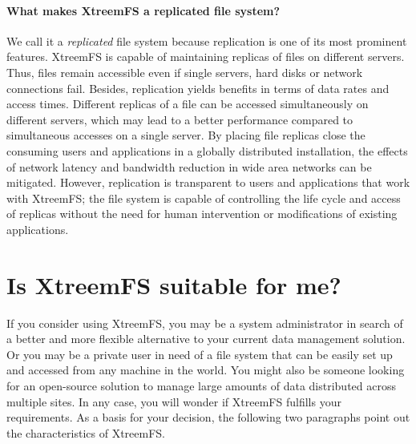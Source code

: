 \documentclass[a4paper,10pt]{book}
\begin{document}
\paragraph{What makes XtreemFS a replicated file system?} We call it a \emph{replicated} file system because replication is one of its most prominent features. XtreemFS is capable of maintaining replicas of files on different servers. Thus, files remain accessible even if single servers, hard disks or network connections fail. Besides, replication yields benefits in terms of data rates and access times. Different replicas of a file can be accessed simultaneously on different servers, which may lead to a better performance compared to simultaneous accesses on a single server. By placing file replicas close the consuming users and applications in a globally distributed installation, the effects of network latency and bandwidth reduction in wide area networks can be mitigated. However, replication is transparent to users and applications that work with XtreemFS; the file system is capable of controlling the life cycle and access of replicas without the need for human intervention or modifications of existing applications.

\section{Is XtreemFS suitable for me?}
If you consider using XtreemFS, you may be a system administrator in search of a better and more flexible alternative to your current data management solution. Or you may be a private user in need of a file system that can be easily set up and accessed from any machine in the world. You might also be someone looking for an open-source solution to manage large amounts of data distributed across multiple sites. In any case, you will wonder if XtreemFS fulfills your requirements. As a basis for your decision, the following two paragraphs point out the characteristics of XtreemFS.
\end{document}
